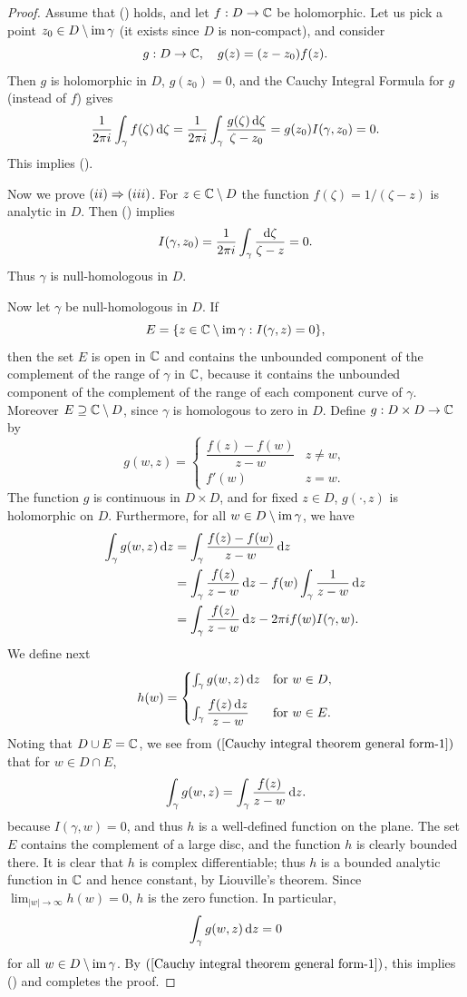 \begin{proof}
Assume that () holds, and let $f:D\to\mathbb{C}$ be holomorphic. Let us pick a point $z_0\in D\setminus\mathrm{im}\,\gamma$ (it exists since $D$ is non-compact), and consider
\[g:D\to\mathbb{C},\quad g(z)=(z-z_0)f(z).\]
Then $g$ is holomorphic in $D$, $g(z_0)=0$, and the Cauchy Integral Formula for $g$ (instead of $f$) gives
\[\frac{1}{2\pi i}\int_{\gamma}f(\zeta)\mathop{}\!\mathrm{d}\zeta=\frac{1}{2\pi i}\int_{\gamma}\frac{g(\zeta)\mathop{}\!\mathrm{d}\zeta}{\zeta-z_0}=g(z_0)I(\gamma,z_0)=0.\]
This implies ().\par
Now we prove $(\rmnum{2})\Rightarrow(\rmnum{3})$. For $z\in\mathbb{C}\setminus D$ the function $f(\zeta)=1/(\zeta-z)$ is analytic in $D$. Then () implies
\[I(\gamma,z_0)=\frac{1}{2\pi i}\int_{\gamma}\frac{\mathop{}\!\mathrm{d} \zeta}{\zeta-z}=0.\]
Thus $\gamma$ is null-homologous in $D$.\par
Now let $\gamma$ be null-homologous in $D$. If
\[E=\{z\in\mathbb{C}\setminus\mathrm{im}\,\gamma:I(\gamma,z)=0\},\]
then the set $E$ is open in $\mathbb{C}$ and contains the unbounded component of the complement of the range of $\gamma$ in $\mathbb{C}$, because it contains the unbounded component of the complement of the range of each component curve of $\gamma$. Moreover $E\supseteq\mathbb{C}\setminus D$, since $\gamma$ is homologous to zero in $D$. Define $g:D\times D\to\mathbb{C}$ by
\[g(w,z)=\begin{cases}
\dfrac{f(z)-f(w)}{z-w}&z\neq w,\\[8pt]
f'(w)&z=w.
\end{cases}\]
The function $g$ is continuous in $D\times D$, and for fixed $z\in D$, $g(\cdot,z)$ is holomorphic on $D$. Furthermore, for all $w\in D\setminus\mathrm{im}\,\gamma$, we have
\begin{equation}\label{Cauchy integral theorem general form-1}
\begin{aligned}
\int_{\gamma}g(w,z)\mathop{}\!\mathrm{d} z&=\int_{\gamma}\frac{f(z)-f(w)}{z-w}\mathop{}\!\mathrm{d} z\\
&=\int_{\gamma}\frac{f(z)}{z-w}\mathop{}\!\mathrm{d} z-f(w)\int_{\gamma}\frac{1}{z-w}\mathop{}\!\mathrm{d} z\\
&=\int_{\gamma}\frac{f(z)}{z-w}\mathop{}\!\mathrm{d} z-2\pi if(w)I(\gamma,w).
\end{aligned}
\end{equation}
We define next
\[h(w)=\begin{cases}
\int_{\gamma}g(w,z)\mathop{}\!\mathrm{d} z&\text{for }w\in D,\\[8pt]
\int_{\gamma}\dfrac{f(z)\mathop{}\!\mathrm{d} z}{z-w}&\text{for }w\in E.
\end{cases}\]
Noting that $D\cup E=\mathbb{C}$, we see from $(\ref{Cauchy integral theorem general form-1})$ that for $w\in D\cap E$,
\[\int_{\gamma}g(w,z)=\int_{\gamma}\frac{f(z)}{z-w}\mathop{}\!\mathrm{d} z.\]
because $I(\gamma,w)=0$, and thus $h$ is a well-defined function on the plane. The set $E$ contains the complement of a large disc, and the function $h$ is clearly bounded there. It is clear that $h$ is complex differentiable; thus $h$ is a bounded analytic function in $\mathbb{C}$ and hence constant, by Liouville's theorem. Since $\lim_{|w|\to\infty}h(w)=0$, $h$ is the zero function. In particular,
\[\int_{\gamma}g(w,z)\mathop{}\!\mathrm{d} z=0\]
for all $w\in D\setminus\mathrm{im}\,\gamma$. By $(\ref{Cauchy integral theorem general form-1})$, this implies () and completes the proof.
\end{proof}
